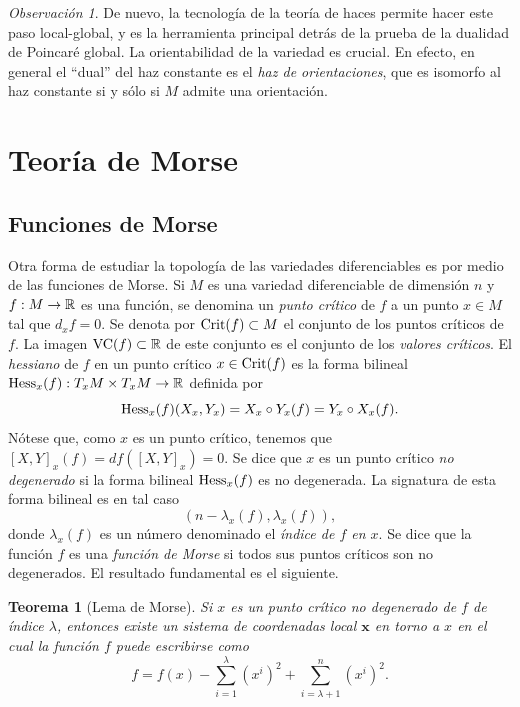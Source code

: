 \documentclass[11pt,a4paper]{amsbook}
\newtheorem{thm}[subsection]{Teorema}
\theoremstyle{remark} \newtheorem{rmk}[subsection]{Observación}
\theoremstyle{definition} \newtheorem{defn}[subsection]{Definición}
\theoremstyle{definition} \newtheorem{ex}[subsection]{Ejemplo}
\theoremstyle{definition} \newtheorem{ej}[subsection]{Ejercicio}
\begin{document}
\begin{rmk}
De nuevo, la tecnología de la teoría de haces permite hacer este paso local-global, y es la herramienta principal detrás de la prueba de la dualidad de Poincaré global. La orientabilidad de la variedad es crucial. En efecto, en general el ``dual'' del haz constante es el \emph{haz de orientaciones}, que es isomorfo al haz constante si y sólo si $M$ admite una orientación.
\end{rmk}

\section{Teoría de Morse}
\subsection{Funciones de Morse} Otra forma de estudiar la topología de las variedades diferenciables es por medio de las funciones de Morse. Si $M$ es una variedad diferenciable de dimensión $n$ y $f:M\rightarrow \mathbb R$ es una función, se denomina un \emph{punto crítico} de $f$ a un punto $x\in M$ tal que $d_xf =0$. Se denota por $\operatorname{Crit}(f)\subset M$ el conjunto de los puntos críticos de $f$. La imagen $\operatorname{VC}(f)\subset \mathbb R$ de este conjunto es el conjunto de los \emph{valores críticos}. El \emph{hessiano} de $f$ en un punto crítico $x\in \operatorname{Crit}(f)$ es la forma bilineal $\operatorname{Hess}_x(f):T_xM\times T_xM \rightarrow \mathbb R$ definida por
\begin{equation*}
\operatorname{Hess}_x(f)(X_x,Y_x) = X_x\circ Y_x(f) = Y_x\circ X_x(f).
\end{equation*}
Nótese que, como $x$ es un punto crítico, tenemos que $[X,Y]_x(f)=df([X,Y]_x)=0$.
Se dice que $x$ es un punto crítico \emph{no degenerado} si la forma bilineal $\operatorname{Hess}_x(f)$ es no degenerada. La signatura de esta forma bilineal es en tal caso
\begin{equation*}
(n-\lambda_x(f),\lambda_x(f)),
\end{equation*}
donde $\lambda_x(f)$ es un número denominado el \emph{índice de $f$ en $x$}. Se dice que la función $f$ es una \emph{función de Morse} si todos sus puntos críticos son no degenerados. El resultado fundamental es el siguiente.

\begin{thm}[Lema de Morse]
  Si $x$ es un punto crítico no degenerado de $f$ de índice $\lambda$, entonces existe un sistema de coordenadas local $\bm{x}$ en torno a $x$ en el cual la función $f$ puede escribirse como
  \begin{equation*}
f = f(x) - \sum_{i=1}^\lambda(x^i)^2 + \sum_{i=\lambda + 1}^n (x^i)^2.
  \end{equation*}
\end{thm}
\end{document}
